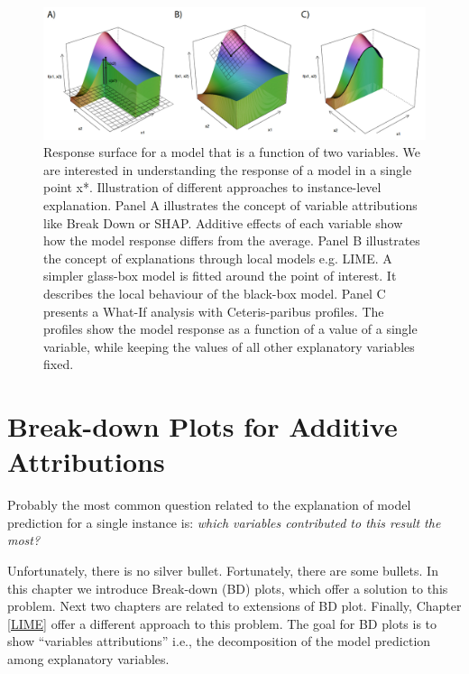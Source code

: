 \documentclass[]{krantz}
\begin{document}
\begin{figure}

{\centering \includegraphics[width=1\linewidth]{figure/cuts_techniki_ready} 

}

\caption{Response surface for a model that is a function of two variables. We are interested in understanding the response of a model in a single point x*. Illustration of different approaches to instance-level explanation. Panel A illustrates the concept of variable attributions like Break Down or SHAP. Additive effects of each variable show how the model response differs from the average. Panel B illustrates the concept of explanations through local models e.g. LIME. A simpler glass-box model is fitted around the point of interest. It describes the local behaviour of the black-box model. Panel C presents a What-If analysis with Ceteris-paribus profiles. The profiles show the model response as a function of a value of a single variable, while keeping the values of all other explanatory variables fixed.}\label{fig:cutsTechnikiReady}
\end{figure}

\hypertarget{breakDown}{%
\chapter{Break-down Plots for Additive Attributions}\label{breakDown}}

Probably the most common question related to the explanation of model prediction for a single instance is: \emph{which variables contributed to this result the most?}

Unfortunately, there is no silver bullet.
Fortunately, there are some bullets.
In this chapter we introduce Break-down (BD) plots, which offer a solution to this problem. Next two chapters are related to extensions of BD plot. Finally, Chapter \ref{LIME} offer a different approach to this problem.
The goal for BD plots is to show ``variables attributions'' i.e., the decomposition of the model prediction among explanatory variables.
\end{document}
